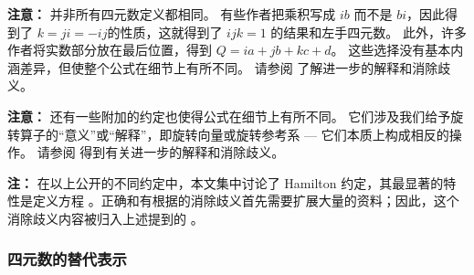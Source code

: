 \bigskip

{\bf 注意：} 并非所有四元数定义都相同。 
有些作者把乘积写成 $ib$ 而不是 $bi$，因此得到了 $k = ji = -ij$的性质，这就得到了 $ijk=1$ 的结果和左手四元数。 
此外，许多作者将实数部分放在最后位置，得到 $Q = ia + jb + kc + d$。
这些选择没有基本内涵差异，但使整个公式在细节上有所不同。 
请参阅  了解进一步的解释和消除歧义。

\bigskip

{\bf 注意：} 还有一些附加的约定也使得公式在细节上有所不同。 
它们涉及我们给予旋转算子的“意义”或“解释”，即旋转向量或旋转参考系 --- 它们本质上构成相反的操作。 
请参阅  得到有关进一步的解释和消除歧义。

\bigskip 

{\bf 注：} 在以上公开的不同约定中，本文集中讨论了 Hamilton 约定，其最显著的特性是定义方程 。正确和有根据的消除歧义首先需要扩展大量的资料；因此，这个消除歧义内容被归入上述提到的 。


\subsubsection{四元数的替代表示}
\label{sec:altQuat}

